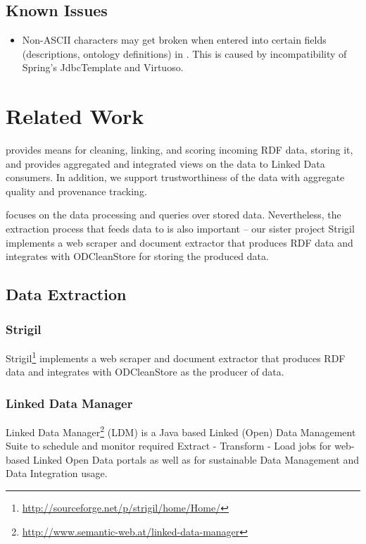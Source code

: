 \section{Known Issues}
\begin{itemize}
	\item Non-ASCII characters may get broken when entered into certain fields (descriptions, ontology definitions) in \FE. This is caused by incompatibility of  Spring's JdbcTemplate and Virtuoso.
	
\end{itemize}

\chapter{Related Work}
\label{chap:relatedWork}
\odcs provides means for cleaning, linking, and scoring incoming RDF data, storing it, and provides aggregated and integrated views on the data to Linked Data consumers. In addition, we support trustworthiness of the data with aggregate quality and provenance tracking. 

\odcs focuses on the data processing and queries over stored data. Nevertheless, the extraction process that feeds data to  \odcs is also important -- our sister project Strigil implements a web scraper and document extractor that produces RDF data and integrates with ODCleanStore for storing the produced data.

\section{Data Extraction}


\subsection*{Strigil}

Strigil\footnote{\url{http://sourceforge.net/p/strigil/home/Home/}} implements a web scraper and document extractor that produces RDF data and integrates with ODCleanStore as the producer of data.

\subsection*{Linked Data Manager}
Linked Data Manager\footnote{\url{http://www.semantic-web.at/linked-data-manager}} (LDM) is a Java based Linked (Open) Data Management Suite to schedule and monitor required Extract - Transform - Load jobs for web-based Linked Open Data portals as well as for sustainable Data Management and Data Integration usage.

